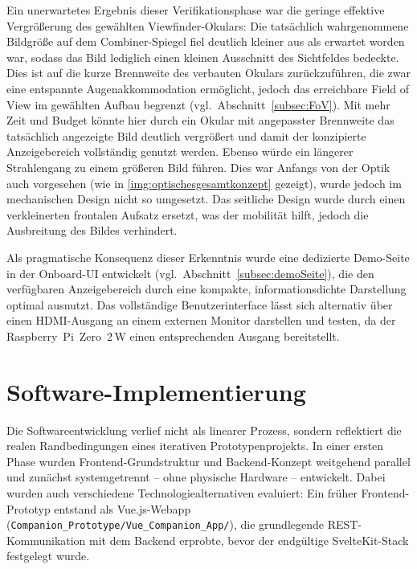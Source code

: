 Ein unerwartetes Ergebnis dieser Verifikationsphase war die geringe effektive
Vergrößerung des gewählten Viewfinder-Okulars: Die tatsächlich wahrgenommene
Bildgröße auf dem Combiner-Spiegel fiel deutlich kleiner aus als erwartet worden war, sodass das Bild lediglich
einen kleinen Ausschnitt des Sichtfeldes bedeckte.
Dies ist auf die kurze Brennweite des verbauten Okulars zurückzuführen,
die zwar eine entspannte Augenakkommodation ermöglicht, jedoch das
erreichbare Field of View im gewählten Aufbau begrenzt (vgl.~Abschnitt~\ref{subsec:FoV}).
\newpage
Mit mehr Zeit und Budget könnte hier durch ein Okular mit angepasster Brennweite das tatsächlich angezeigte Bild
deutlich vergrößert und damit der konzipierte Anzeigebereich vollständig genutzt werden. Ebenso würde ein längerer Strahlengang zu einem größeren Bild führen. Dies war Anfangs von der Optik auch vorgesehen (wie in \ref{img:optischesgesamtkonzept} gezeigt), wurde jedoch im mechanischen Design nicht so umgesetzt. Das seitliche Design wurde durch einen verkleinerten frontalen Aufsatz ersetzt, was der mobilität hilft, jedoch die Ausbreitung des Bildes verhindert.

Als pragmatische Konsequenz dieser Erkenntnis wurde eine dedizierte Demo-Seite
in der Onboard-UI entwickelt (vgl.~Abschnitt~\ref{subsec:demoSeite}), die den
verfügbaren Anzeigebereich durch eine kompakte, informationsdichte Darstellung
optimal ausnutzt.
Das vollständige Benutzerinterface lässt sich alternativ über einen HDMI-Ausgang
an einem externen Monitor darstellen und testen, da der Raspberry~Pi~Zero~2\,W
einen entsprechenden Ausgang bereitstellt.

\section{Software-Implementierung}
\label{sec:softwareImplementierung}

Die Softwareentwicklung verlief nicht als linearer Prozess, sondern reflektiert
die realen Randbedingungen eines iterativen Prototypenprojekts.
In einer ersten Phase wurden Frontend-Grundstruktur und Backend-Konzept weitgehend
parallel und zunächst systemgetrennt -- ohne physische Hardware -- entwickelt.
Dabei wurden auch verschiedene Technologiealternativen evaluiert: Ein früher
Frontend-Prototyp entstand als Vue.js-Webapp
(\texttt{Companion\_Prototype/Vue\_Companion\_App/}), die grundlegende
REST-Kommunikation mit dem Backend erprobte, bevor der endgültige
SvelteKit-Stack festgelegt wurde.


